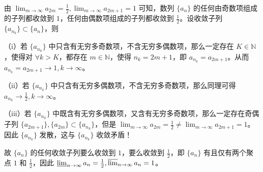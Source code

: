 \documentclass[lang=cn,newtx,10pt,scheme=chinese]{../Template/elegantbook}
\begin{document}
\begin{remark}
由 $\lim_{m\rightarrow \infty}a_{2m}=\frac{1}{2}, \lim_{m\rightarrow \infty}a_{2m+1}=1$ 可知，数列 $\{ a_n \}$ 的任何由奇数项组成的子列都收敛到 $1$，任何由偶数项组成的子列都收敛到 $\frac{1}{2}$。设收敛子列 $\{ a_{n_k} \} \subset \{ a_n \}$，则

（i）若 $\{ a_{n_k} \}$ 中只含有无穷多奇数项，不含无穷多偶数项，那么一定存在 $K\in \mathbb{N}$，使得对 $\forall k>K$，都存在 $m\in \mathbb{N}$，使得 $n_k = 2m + 1$，即 $a_{n_k} = a_{2m + 1}$。从而 $a_{n_k} = a_{2m + 1} \rightarrow 1, k\rightarrow \infty$。

（ii）若 $\{ a_{n_k} \}$ 中只含有无穷多偶数项，不含无穷多奇数项，那么同理可得 $a_{n_k} \rightarrow \frac{1}{2}, k\rightarrow \infty$。

（iii）若 $\{ a_{n_k} \}$ 中既含有无穷多偶数项，又含有无穷多奇数项，那么一定存在奇偶子列 $\{ a_{2m + 1} \}, \{ a_{2m} \} \subset \{ a_{n_k} \}$，但是 $\lim_{m\rightarrow \infty}a_{2m} = \frac{1}{2} \neq \lim_{m\rightarrow \infty}a_{2m + 1} = 1$。因此 $\{ a_{n_k} \}$ 发散，这与 $\{ a_{n_k} \}$ 收敛矛盾！

故 $\{ a_n \}$ 的任何收敛子列要么收敛到 $1$，要么收敛到 $\frac{1}{2}$，即 $\{ a_n \}$ 有且仅有两个聚点 $1$ 和 $\frac{1}{2}$，因此 $\varliminf_{n\rightarrow \infty}a_n = \frac{1}{2}, \varlimsup_{n\rightarrow \infty}a_n = 1$。
\end{remark}
\end{document}
